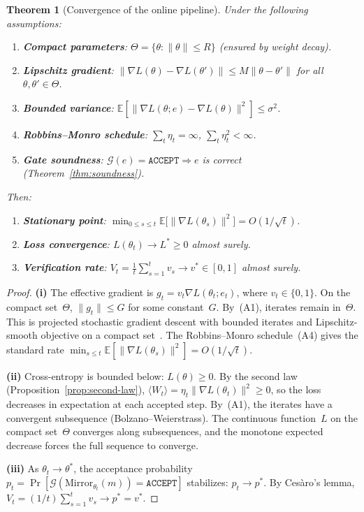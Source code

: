 \documentclass[11pt,a4paper]{article}
\newtheorem{theorem}{Theorem}[section]
\newcommand{\cG}{\mathcal{G}}
\newcommand{\Mirror}{\mathrm{Mirror}}
\begin{document}
\begin{theorem}[Convergence of the online pipeline]%
\label{thm:converge}
Under the following assumptions:
\begin{enumerate}[nosep, label=\textup{(A\arabic*)}]
\item \textbf{Compact parameters}:
  $\Theta = \{\theta : \|\theta\| \leq R\}$
  (ensured by weight decay).
\item \textbf{Lipschitz gradient}:
  $\|\nabla L(\theta) - \nabla L(\theta')\|
   \leq M\|\theta - \theta'\|$
  for all $\theta, \theta' \in \Theta$.
\item \textbf{Bounded variance}:
  $\mathbb{E}[\|\nabla L(\theta; e)
   - \nabla L(\theta)\|^2] \leq \sigma^2$.
\item \textbf{Robbins--Monro schedule}:
  $\sum_t \eta_t = \infty$,
  $\sum_t \eta_t^2 < \infty$.
\item \textbf{Gate soundness}:
  $\cG(e) = \texttt{ACCEPT}
   \Rightarrow e$ is correct
  (Theorem~\ref{thm:soundness}).
\end{enumerate}
Then:
\begin{enumerate}[nosep, label=\textup{(\roman*)}]
\item \textbf{Stationary point}:
  $\displaystyle\min_{0 \leq s \leq t}
    \mathbb{E}\bigl[\|\nabla L(\theta_s)\|^2\bigr]
    = O(1/\sqrt{t})$.
\item \textbf{Loss convergence}:
  $L(\theta_t) \to L^* \geq 0$ almost surely.
\item \textbf{Verification rate}:
  $\displaystyle V_t = \frac{1}{t}\sum_{s=1}^{t} v_s
    \to v^* \in [0, 1]$ almost surely.
\end{enumerate}
\end{theorem}

\begin{proof}
\textbf{(i)}
The effective gradient is
$g_t = v_t \nabla L(\theta_t; e_t)$,
where $v_t \in \{0, 1\}$.
On the compact set~$\Theta$,
$\|g_t\| \leq G$ for some constant~$G$.
By~(A1), iterates remain in~$\Theta$.
This is projected stochastic gradient descent
with bounded iterates and Lipschitz-smooth
objective on a compact set~\cite{SS12,Ha16}.
The Robbins--Monro schedule~(A4)
gives the standard rate
$\min_{s \leq t}
  \mathbb{E}[\|\nabla L(\theta_s)\|^2] = O(1/\sqrt{t})$.

\textbf{(ii)}
Cross-entropy is bounded below: $L(\theta) \geq 0$.
By the second law (Proposition~\ref{prop:second-law}),
$\langle W_t \rangle
  = \eta_t \|\nabla L(\theta_t)\|^2 \geq 0$,
so the loss decreases in expectation at each accepted step.
By~(A1), the iterates have a convergent
subsequence (Bolzano--Weierstrass).
The continuous function~$L$ on the compact set~$\Theta$
converges along subsequences, and the monotone
expected decrease forces the full sequence to converge.

\textbf{(iii)}
As $\theta_t \to \theta^*$, the acceptance probability
$p_t = \Pr[\cG(\Mirror_{\theta_t}(m)) = \texttt{ACCEPT}]$
stabilizes: $p_t \to p^*$.
By Ces\`{a}ro's lemma,
$V_t = (1/t)\sum_{s=1}^{t} v_s \to p^* = v^*$.
\end{proof}
\end{document}
